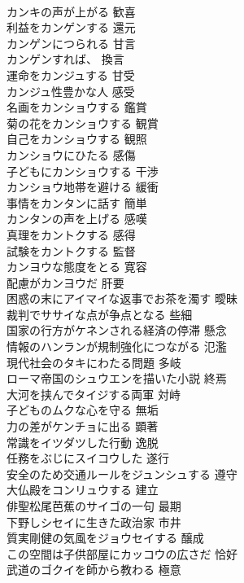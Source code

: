 \documentclass[8pt]{extreport}
\begin{document}
\begin{CJK}{UTF8}{min}
\\	カンキの声が上がる	歓喜
\\	利益をカンゲンする	還元
\\	カンゲンにつられる	甘言
\\	カンゲンすれば、	換言
\\	運命をカンジュする	甘受
\\	カンジュ性豊かな人	感受
\\	名画をカンショウする	鑑賞
\\	菊の花をカンショウする	観賞
\\	自己をカンショウする	観照
\\	カンショウにひたる	感傷
\\	子どもにカンショウする	干渉
\\	カンショウ地帯を避ける	緩衝
\\	事情をカンタンに話す	簡単
\\	カンタンの声を上げる	感嘆
\\	真理をカントクする	感得
\\	試験をカントクする	監督
\\	カンヨウな態度をとる	寛容
\\	配慮がカンヨウだ	肝要
\\	困惑の末にアイマイな返事でお茶を濁す	曖昧
\\	裁判でササイな点が争点となる	些細
\\	国家の行方がケネンされる経済の停滞	懸念
\\	情報のハンランが規制強化につながる	氾濫
\\	現代社会のタキにわたる問題	多岐
\\	ローマ帝国のシュウエンを描いた小説	終焉
\\	大河を挟んでタイジする両軍	対峙
\\	子どものムクな心を守る	無垢
\\	力の差がケンチョに出る	顕著
\\	常識をイツダツした行動	逸脱
\\	任務をぶじにスイコウした	遂行
\\	安全のため交通ルールをジュンシュする	遵守
\\	大仏殿をコンリュウする	建立
\\	俳聖松尾芭蕉のサイゴの一句	最期
\\	下野しシセイに生きた政治家	市井
\\	質実剛健の気風をジョウセイする	醸成
\\	この空間は子供部屋にカッコウの広さだ	恰好
\\	武道のゴクイを師から教わる	極意

\end{CJK}
\end{document}
